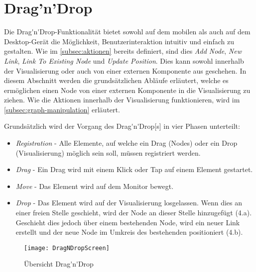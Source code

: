 \section{Drag'n'Drop}
\label{dnd}
Die \gls{Drag'n'Drop}-Funktionalität bietet sowohl auf dem mobilen als auch auf dem Desktop-Gerät die Möglichkeit, Benutzerinteraktion intuitiv und einfach zu gestalten. Wie im \autoref{subsec:aktionen} bereits definiert, sind dies \textit{Add Node}, \textit{New Link}, \textit{Link To Existing Node} und \textit{Update Position}. Dies kann sowohl innerhalb der Visualisierung oder auch von einer externen Komponente aus geschehen. In diesem Abschnitt werden die grundsätzlichen Abläufe erläutert, welche es ermöglichen einen \gls{Node} von einer externen Komponente in die Visualisierung zu ziehen. Wie die Aktionen innerhalb der Visualisierung funktionieren, wird im \autoref{subsec:graph-manipulation} erläutert.

Grundsätzlich wird der Vorgang des \gls{Drag'n'Drop}[s] in vier Phasen unterteilt:

\begin{itemize}
    \item \textit{Registration} - Alle Elemente, auf welche ein Drag (Nodes) oder ein Drop (Visualisierung) möglich sein soll, müssen registriert werden. 
    \item \textit{Drag} - Ein Drag wird mit einem Klick oder Tap auf einem Element gestartet.
    \item \textit{Move} - Das Element wird auf dem Monitor bewegt.
    \item \textit{Drop} - Das Element wird auf der Visualisierung losgelassen. Wenn dies an einer freien Stelle geschieht, wird der \gls{Node} an dieser Stelle hinzugefügt (4.a). Geschieht dies jedoch über einem bestehenden \gls{Node}, wird ein neuer \gls{Link} erstellt und der neue \gls{Node} im Umkreis des bestehenden positioniert (4.b).
\end{itemize}


\begin{figure}[htbp]
\centerline{\texttt{[image: DragNDropScreen]}}
\caption{Übersicht \gls{Drag'n'Drop}}
\label{fig:dnd-screen}
\end{figure}

